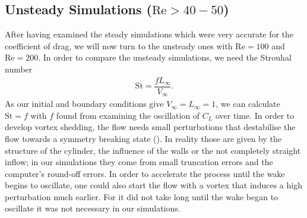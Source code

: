 	\subsection{Unsteady Simulations ($\text{Re}> 40-50$)}
	After having examined the steady simulations which were very accurate for the coefficient of drag, we will now turn to the unsteady ones with $\text{Re}=100$ and $\text{Re}=200$.
	In order to compare the unsteady simulations, we need the Strouhal number
	\begin{align}
		\text{St} = \dfrac{f  L_\infty}{V_\infty}.
	\end{align}
	As our initial and boundary conditions give $V_\infty = L_\infty = 1$, we can calculate $\text{St} = f$ with $f$ found from examining the oscillation of $C_L$ over time. In order to develop vortex shedding, the flow needs small perturbations that destabilise the flow towards a symmetry breaking state (\textcite{FLM:14223}). In reality those are given by the structure of the cylinder, the influence of the walls or the not completely straight inflow; in our simulations they come from small truncation errors and the computer's round-off errors. 
	In order to accelerate the process until the wake begins to oscillate, one could also start the flow with a vortex that induces a high perturbation much earlier. For it did not take long until the wake began to oscillate it was not necessary in our simulations.
	
